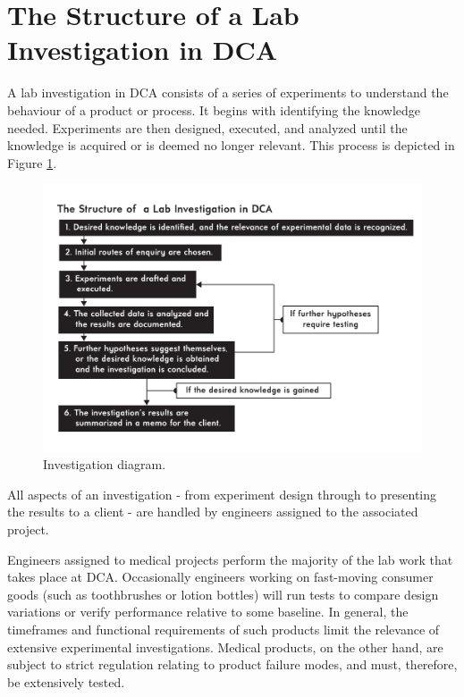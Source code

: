 \documentclass[11pt,a4paper,article]{memoir} %
\begin{document}
\section{The Structure of a Lab Investigation in DCA}
A lab investigation in DCA consists of a series of experiments to understand the behaviour of a product or process. It begins with identifying the knowledge needed. Experiments are then designed, executed, and analyzed until the knowledge is acquired or is deemed no longer relevant. This process is depicted in Figure \ref{fig:investigation_diagram}.
\begin{figure}[h!]
\centering
\includegraphics[width=1.2\textwidth]{Lab_Investigation_Diagram.pdf}
\caption{Investigation diagram.}
\label{fig:investigation_diagram}
\end{figure}
All aspects of an investigation - from experiment design through to presenting the results to a client - are handled by engineers assigned to the associated project. 
\par
Engineers assigned to medical projects perform the majority of the lab work that takes place at DCA. Occasionally engineers working on fast-moving consumer goods (such as toothbrushes or lotion bottles) will run tests to compare design variations or verify performance relative to some baseline. In general, the timeframes and functional requirements of such products limit the relevance of extensive experimental investigations. Medical products, on the other hand, are subject to strict regulation relating to product failure modes, and must, therefore, be extensively tested.
\par
\end{document}
